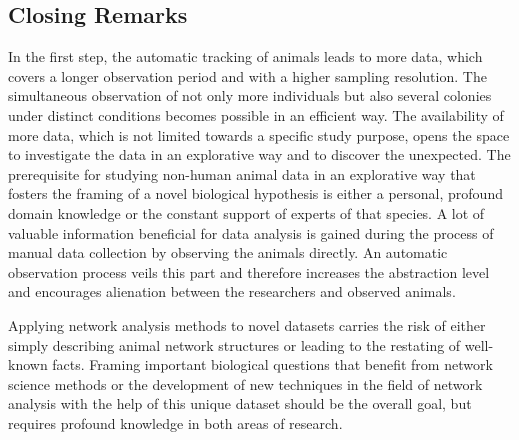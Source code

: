\subsection{Closing Remarks}
In the first step, the automatic tracking of animals leads to more data, which covers a longer observation period and with a higher sampling resolution. The simultaneous observation of not only more individuals but also several colonies under distinct conditions becomes possible in an efficient way.
The availability of more data, which is not limited towards a specific study purpose, opens the space to investigate the data in an explorative way and to discover the unexpected.
The prerequisite for studying non-human animal data in an explorative way that fosters the framing of a novel biological hypothesis is either a personal, profound domain knowledge or the constant support of experts of that species.
A lot of valuable information beneficial for data analysis is gained during the process of manual data collection by observing the animals directly. An automatic observation process veils this part and therefore increases the abstraction level and encourages alienation between the researchers and observed animals.

Applying network analysis methods to novel datasets carries the risk of either simply describing animal network structures or leading to the restating of well-known facts. Framing important biological questions that benefit from network science methods or the development of new techniques in the field of network analysis with the help of this unique dataset should be the overall goal, but requires profound knowledge in both areas of research.